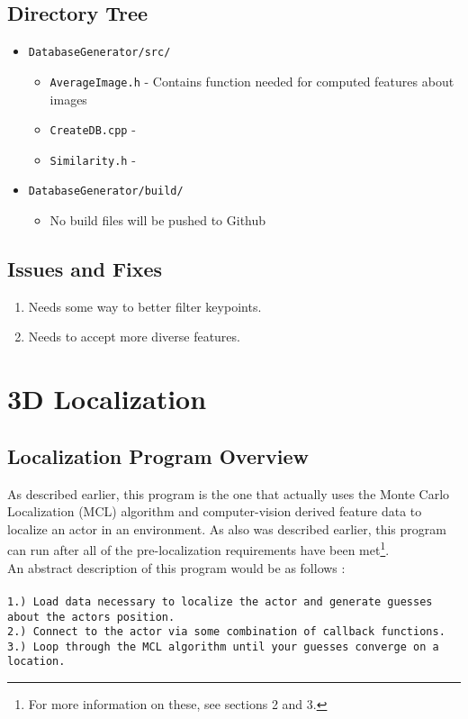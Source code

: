 \documentclass[a4paper,11pt]{article}
\begin{document}
  \subsection{Directory Tree}
    \begin{itemize}
     \item \texttt{DatabaseGenerator/src/}
       \begin{itemize}
        \item \texttt{AverageImage.h} - Contains function needed for computed features about images
        \item \texttt{CreateDB.cpp} -
        \item \texttt{Similarity.h} -
       \end{itemize}
     \item \texttt{DatabaseGenerator/build/}
       \begin{itemize}
        \item No build files will be pushed to Github
       \end{itemize}
    \end{itemize}
    
    \subsection{Issues and Fixes}
    \begin{enumerate}
      \item Needs some way to better filter keypoints.
      \item Needs to accept more diverse features.
    \end{enumerate}
    \newpage



    

\section{3D Localization}

  \subsection{Localization Program Overview}
  As described earlier, this program is the one that actually uses the Monte Carlo Localization (MCL) algorithm and computer-vision derived feature data to localize an actor in an environment.
  As also was described earlier, this program can run after all of the pre-localization requirements have been met\footnote{For more information on these, see sections 2 and 3.}.
  \\ An abstract description of this program would be as follows : \\
  \\ \texttt{1.) Load data necessary to localize the actor and generate guesses about the actors position.} 
  \\ \texttt{2.) Connect to the actor via some combination of callback functions.}
  \\ \texttt{3.) Loop through the MCL algorithm until your guesses converge on a location.} \\
  
\end{document}
